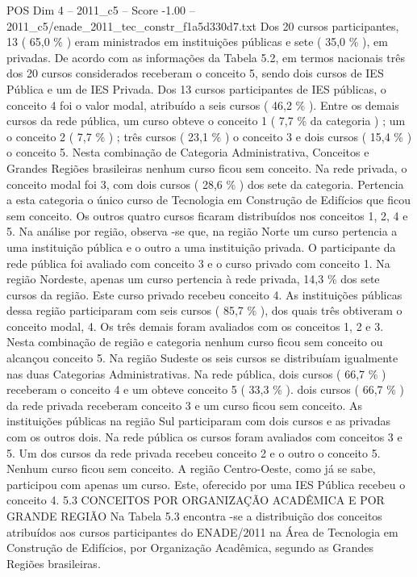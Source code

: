 \begin{textsample}{POS Dim 4 – 2011\_c5 – Score -1.00 – 2011\_c5/enade\_2011\_tec\_constr\_f1a5d330d7.txt}
Dos 20 cursos participantes, 13 ( 65,0 \% ) eram ministrados em instituições públicas e sete ( 35,0 \% ), em privadas.
De acordo com as informações da Tabela 5.2, em termos nacionais três dos 20 cursos considerados receberam o conceito 5, sendo dois cursos de IES Pública e um de IES Privada.
Dos 13 cursos participantes de IES públicas, o conceito 4 foi o valor modal, atribuído a seis cursos ( 46,2 \% ).
Entre os demais cursos da rede pública, um curso obteve o conceito 1 ( 7,7 \% da categoria ) ; um o conceito 2 ( 7,7 \% ) ; três cursos ( 23,1 \% ) o conceito 3 e dois cursos ( 15,4 \% ) o conceito 5.
Nesta combinação de Categoria Administrativa, Conceitos e Grandes Regiões brasileiras nenhum curso ficou sem conceito.
Na rede privada, o conceito modal foi 3, com dois cursos ( 28,6 \% ) dos sete da categoria.
Pertencia a esta categoria o único curso de Tecnologia em Construção de Edifícios que ficou sem conceito.
Os outros quatro cursos ficaram distribuídos nos conceitos 1, 2, 4 e 5.
Na análise por região, observa -se que, na região Norte um curso pertencia a uma instituição pública e o outro a uma instituição privada.
O participante da rede pública foi avaliado com conceito 3 e o curso privado com conceito 1.
Na região Nordeste, apenas um curso pertencia à rede privada, 14,3 \% dos sete cursos da região.
Este curso privado recebeu conceito 4.
As instituições públicas dessa região participaram com seis cursos ( 85,7 \% ), dos quais três obtiveram o conceito modal, 4.
Os três demais foram avaliados com os conceitos 1, 2 e 3.
Nesta combinação de região e categoria nenhum curso ficou sem conceito ou alcançou conceito 5.
Na região Sudeste os seis cursos se distribuíam igualmente nas duas Categorias Administrativas.
Na rede pública, dois cursos ( 66,7 \% ) receberam o conceito 4 e um obteve conceito 5 ( 33,3 \% ). dois cursos ( 66,7 \% ) da rede privada receberam conceito 3 e um curso ficou sem conceito.
As instituições públicas na região Sul participaram com dois cursos e as privadas com os outros dois.
Na rede pública os cursos foram avaliados com conceitos 3 e 5.
Um dos cursos da rede privada recebeu conceito 2 e o outro o conceito 5.
Nenhum curso ficou sem conceito.
A região Centro-Oeste, como já se sabe, participou com apenas um curso.
Este, oferecido por uma IES Pública recebeu o conceito 4. 5.3 CONCEITOS POR ORGANIZAÇÃO ACADÊMICA E POR GRANDE REGIÃO Na Tabela 5.3 encontra -se a distribuição dos conceitos atribuídos aos cursos participantes do ENADE/2011 na Área de Tecnologia em Construção de Edifícios, por Organização Acadêmica, segundo as Grandes Regiões brasileiras.

\end{textsample}
